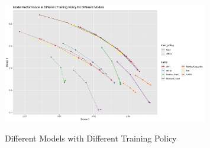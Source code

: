 \documentclass{article}
\begin{document}
\begin{figure}
    \caption{Different Models with Different Training Policy}
    \centering
    \includegraphics[width = 0.8\textwidth]{images/ModelPerformanceatDifferentModelswithDifferentTrainingPolicy.png}
    \label{fig:fig1.5.3}
\end{figure}
\end{document}

